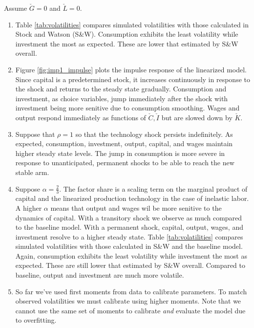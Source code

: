 \documentclass[11pt]{article}
\begin{document}
    Assume $\check G = 0$ and $\check L = 0$.

    \begin{enumerate}

        \item Table \ref{tab:volatilities} compares simulated volatilities with those calculated in Stock and Watson (S\&W). Consumption exhibits the least volatility while investment the most as expected. These are lower that estimated by S\&W overall.

        \item Figure \ref{fig:imp1_impulse} plots the impulse response of the linearized model. Since capital is a predetermined stock, it increases continuously in response to the shock and returns to the steady state gradually. Consumption and investment, as choice variables, jump immediately after the shock with investment being more senitive due to consumption smoothing. Wages and output respond immediately as functions of $\check C, \check I$ but are slowed down by $\check K$.

        \item Suppose that $\rho = 1$ so that the technology shock persists indefinitely. As expected, consumption, investment, output, capital, and wages maintain higher steady state levels. The jump in consumption is more severe in response to unanticipated, permanent shocks to be able to reach the new stable arm.

        \item Suppose $\alpha = \frac{2}{3}$. The factor share is a scaling term on the marginal product of capital and the linearized production technology in the case of inelastic labor. A higher $\alpha$ means that output and wages wil be more senitive to the dynamics of capital. With a transitory shock we observe as much compared to the baseline model. With a permanent shock, capital, output, wages, and investment resolve to a higher steady state. Table \ref{tab:volatilities} compares simulated volatilities with those calculated in S\&W and the baseline model. Again, consumption exhibits the least volatility while investment the most as expected. These are still lower that estimated by S\&W overall. Compared to baseline, output and investment are much more volatile.

        \item So far we've used first moments from data to calibrate parameters. To match observed volatilities we must calibrate using higher moments. Note that we cannot use the same set of moments to calibrate \emph{and} evaluate the model due to overfitting.

    \end{enumerate}
\end{document}

